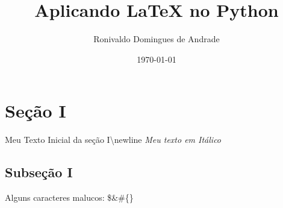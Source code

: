 \documentclass{article}%
\title{Aplicando LaTeX no Python}%
\author{Ronivaldo Domingues de Andrade}%
\date{\today}%
\begin{document}
%
\normalsize%
\maketitle%
\section{Seção I}%
\label{sec:SeoI}%
Meu Texto Inicial da seção I\textbackslash{}newline%
\textit{ Meu texto em Itálico}%
\subsection{Subseção I}%
\label{subsec:SubseoI}%
Alguns caracteres malucos: \$\&\#\{\}

%
\end{document}
